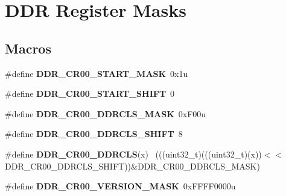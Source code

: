 \hypertarget{group___d_d_r___register___masks}{}\section{D\+D\+R Register Masks}
\label{group___d_d_r___register___masks}
\subsection*{Macros}
\begin{DoxyCompactItemize}
\item 
\hypertarget{group___d_d_r___register___masks_gaa59464f6540e6b443a2249f0d8040db2}{}\#define {\bfseries D\+D\+R\+\_\+\+C\+R00\+\_\+\+S\+T\+A\+R\+T\+\_\+\+M\+A\+S\+K}~0x1u\label{group___d_d_r___register___masks_gaa59464f6540e6b443a2249f0d8040db2}

\item 
\hypertarget{group___d_d_r___register___masks_gaba294aade0a27379f689e9881b7003ff}{}\#define {\bfseries D\+D\+R\+\_\+\+C\+R00\+\_\+\+S\+T\+A\+R\+T\+\_\+\+S\+H\+I\+F\+T}~0\label{group___d_d_r___register___masks_gaba294aade0a27379f689e9881b7003ff}

\item 
\hypertarget{group___d_d_r___register___masks_gaa8350f79e9a0c4dc5ee0a98d4d1255c5}{}\#define {\bfseries D\+D\+R\+\_\+\+C\+R00\+\_\+\+D\+D\+R\+C\+L\+S\+\_\+\+M\+A\+S\+K}~0x\+F00u\label{group___d_d_r___register___masks_gaa8350f79e9a0c4dc5ee0a98d4d1255c5}

\item 
\hypertarget{group___d_d_r___register___masks_gac5b1c07ed02eb4a78748a49b7c78e6c2}{}\#define {\bfseries D\+D\+R\+\_\+\+C\+R00\+\_\+\+D\+D\+R\+C\+L\+S\+\_\+\+S\+H\+I\+F\+T}~8\label{group___d_d_r___register___masks_gac5b1c07ed02eb4a78748a49b7c78e6c2}

\item 
\hypertarget{group___d_d_r___register___masks_gae85c757c25a7af4ec54a6a55a58ea27c}{}\#define {\bfseries D\+D\+R\+\_\+\+C\+R00\+\_\+\+D\+D\+R\+C\+L\+S}(x)                                          ~(((uint32\+\_\+t)(((uint32\+\_\+t)(x))$<$$<$D\+D\+R\+\_\+\+C\+R00\+\_\+\+D\+D\+R\+C\+L\+S\+\_\+\+S\+H\+I\+F\+T))\&D\+D\+R\+\_\+\+C\+R00\+\_\+\+D\+D\+R\+C\+L\+S\+\_\+\+M\+A\+S\+K)\label{group___d_d_r___register___masks_gae85c757c25a7af4ec54a6a55a58ea27c}

\item 
\hypertarget{group___d_d_r___register___masks_ga2237413f3a5ceab44eb69500e792ecc3}{}\#define {\bfseries D\+D\+R\+\_\+\+C\+R00\+\_\+\+V\+E\+R\+S\+I\+O\+N\+\_\+\+M\+A\+S\+K}~0x\+F\+F\+F\+F0000u\label{group___d_d_r___register___masks_ga2237413f3a5ceab44eb69500e792ecc3}


\end{DoxyCompactItemize}
